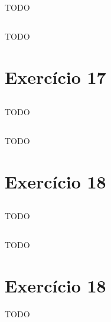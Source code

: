 \documentclass{article}
\begin{document}
\subsection{}
TODO
\subsection{}
TODO

\section{Exercício 17}
\subsection{}
TODO
\subsection{}
TODO

\section{Exercício 18}
\subsection{}
TODO
\subsection{}
TODO

\section{Exercício 18}
TODO
\end{document}
